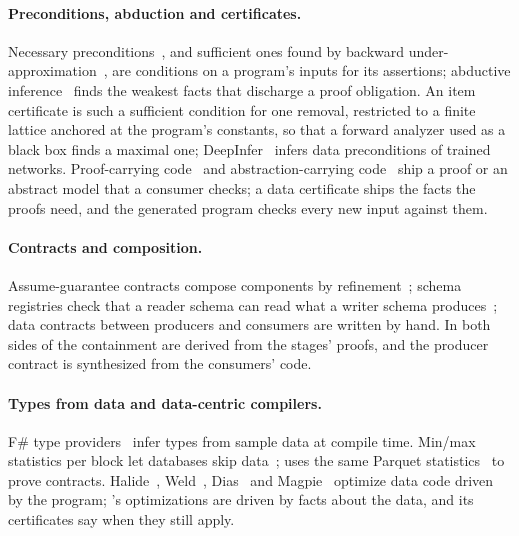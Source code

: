 \paragraph{Preconditions, abduction and certificates.} Necessary preconditions~\cite{cousot2013}, and
sufficient ones found by backward under-approximation~\cite{mine2014}, are conditions on a program's
inputs for its assertions; abductive inference~\cite{dillig2012} finds the weakest facts that discharge a
proof obligation. An item certificate is such a sufficient condition for one removal, restricted to a
finite lattice anchored at the program's constants, so that a forward analyzer used as a black box
finds a maximal one; DeepInfer~\cite{ahmed2024} infers data preconditions of trained networks.
Proof-carrying code~\cite{necula1997} and abstraction-carrying code~\cite{albert2004} ship a proof or
an abstract model that a consumer checks; a data certificate ships the facts the proofs need, and the
generated program checks every new input against them.

\paragraph{Contracts and composition.} Assume-guarantee contracts compose components by
refinement~\cite{benveniste2018}; schema registries check that a reader schema can read what a writer
schema produces~\cite{avro}; data contracts between producers and consumers are written by hand. In
\PL both sides of the containment are derived from the stages' proofs, and the producer contract is
synthesized from the consumers' code.

\paragraph{Types from data and data-centric compilers.} F\# type providers~\cite{petricek2016} infer
types from sample data at compile time. Min/max statistics per block let databases skip
data~\cite{moerkotte1998}; \PL uses the same Parquet statistics~\cite{parquet} to prove contracts.
Halide~\cite{ragan2013}, Weld~\cite{palkar2017}, Dias~\cite{baziotis2024} and
Magpie~\cite{jindal2021} optimize data code driven by the program; \PL's optimizations are driven by
facts about the data, and its certificates say when they still apply.
